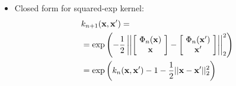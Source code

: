 \documentclass[portrait,a0b,final,a4resizeable]{include/a0poster}
\begin{document}
\begin{poster}
\begin{multicols}{2}
\begin{minipage}[c]{0.5\columnwidth}
\begin{itemize}
\item Closed form for squared-exp kernel: %
%
%
%
%
%
\begin{align*}
& k_{n+1}(\mathbf{x}, \mathbf{x}') = \nonumber \\
& = \exp \left( -\frac{1}{2} \left|\left| \left[ \! \begin{array}{c} \Phi_n(\mathbf{x}) \\ \mathbf{x} \end{array} \! \right]  - \left[ \! \begin{array}{c} \Phi_n(\mathbf{x}') \\ \mathbf{x}' \end{array} \! \right] \right| \right|_2^2 \right) \nonumber \\
& = \exp \left( k_n(\mathbf{x}, \mathbf{x}') - 1 -\frac{1}{2} || \mathbf{x} - \mathbf{x}' ||_2^2 \right)
\end{align*}


\end{itemize}
\end{minipage}
\end{multicols}
\end{poster}
\end{document}
